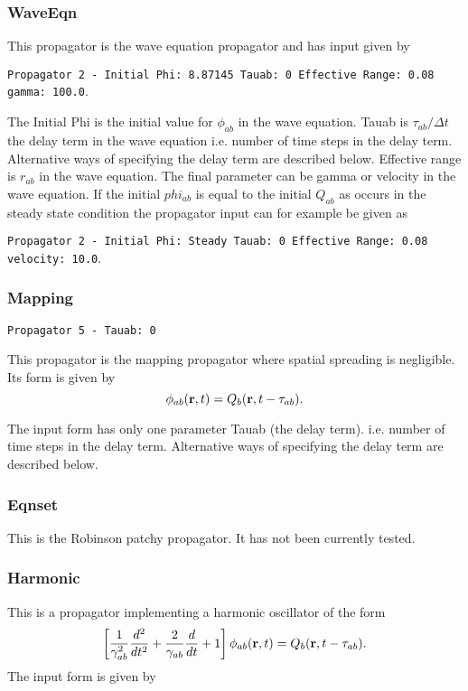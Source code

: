 \documentclass[12pt,a4paper]{article}
\begin{document}
\subsubsection{WaveEqn}
This propagator is the wave equation propagator and has input given by

{\tt \small Propagator 2 - Initial Phi: 8.87145 Tauab: 0 Effective Range: 0.08
gamma: 100.0}.

The Initial Phi is the initial value for $\phi_{ab}$ in the
wave equation. Tauab is $\tau_{ab}/ \Delta t$ the delay term in the wave equation
i.e. number of time steps in the delay term. Alternative ways of specifying
the delay term are described below.
Effective range is $r_{ab}$
in the wave equation. The final parameter can be gamma or velocity in the wave equation.
If the initial $phi_{ab}$ is equal to the initial $Q_{ab}$ as occurs in the steady state condition
the propagator input can for example be given as

{\tt \small Propagator 2 - Initial Phi: Steady Tauab: 0 Effective Range: 0.08
velocity: 10.0}.


\subsubsection{Mapping}
{\tt \small Propagator 5  - Tauab: 0 }

This propagator is the mapping propagator where spatial spreading is negligible.
Its form is given by
\begin{equation}
\phi_{ab}({\bf r}, t) = Q_b ({\bf r}, t - \tau_{ab}).
\end{equation}

The input form has only one parameter Tauab (the delay term).
i.e. number of time steps in the delay term. Alternative ways of specifying
the delay term are described below.

\subsubsection{Eqnset}

This is the Robinson patchy propagator. It has not been currently tested.

\subsubsection{Harmonic}
This is a propagator implementing a harmonic oscillator of the form
\begin{equation}
\left[\frac{1}{\gamma_{ab}^2}\frac{d^2}{d t^2}+\frac{2}{\gamma_{ab}}\frac{d}
{d t}+1 \right] \phi_{ab}({\bf r},t)
=Q_b({\bf r},t-\tau_{ab}).
\end{equation}
The input form is given by 
\end{document}
